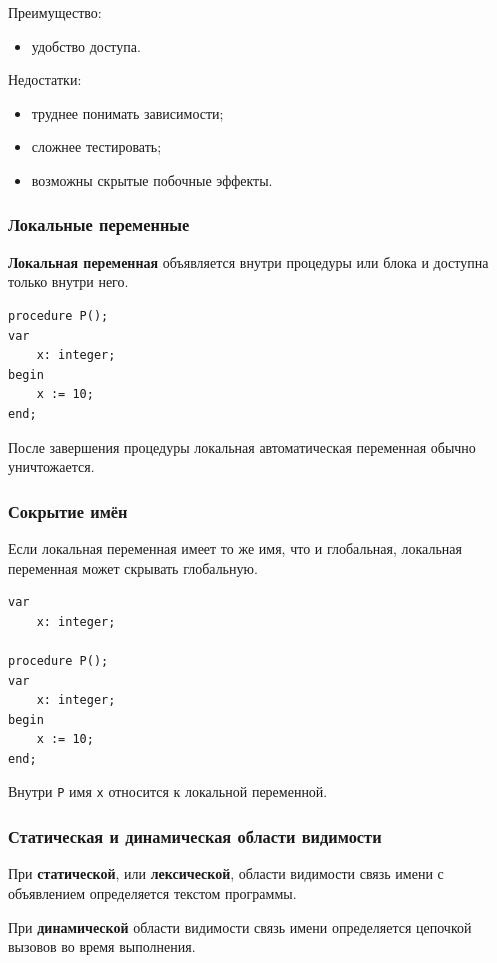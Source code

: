 \documentclass[12pt,a4paper]{article}
\begin{document}
Преимущество:
\begin{itemize}
    \item удобство доступа.
\end{itemize}

Недостатки:
\begin{itemize}
    \item труднее понимать зависимости;
    \item сложнее тестировать;
    \item возможны скрытые побочные эффекты.
\end{itemize}

\subsubsection{Локальные переменные}

\textbf{Локальная переменная} объявляется внутри процедуры или блока и доступна только внутри него.

\begin{verbatim}
procedure P();
var
    x: integer;
begin
    x := 10;
end;
\end{verbatim}

После завершения процедуры локальная автоматическая переменная обычно уничтожается.

\subsubsection{Сокрытие имён}

Если локальная переменная имеет то же имя, что и глобальная, локальная переменная может скрывать глобальную.

\begin{verbatim}
var
    x: integer;

procedure P();
var
    x: integer;
begin
    x := 10;
end;
\end{verbatim}

Внутри \texttt{P} имя \texttt{x} относится к локальной переменной.

\subsubsection{Статическая и динамическая области видимости}

При \textbf{статической}, или \textbf{лексической}, области видимости связь имени с объявлением определяется текстом программы.

При \textbf{динамической} области видимости связь имени определяется цепочкой вызовов во время выполнения.
\end{document}

